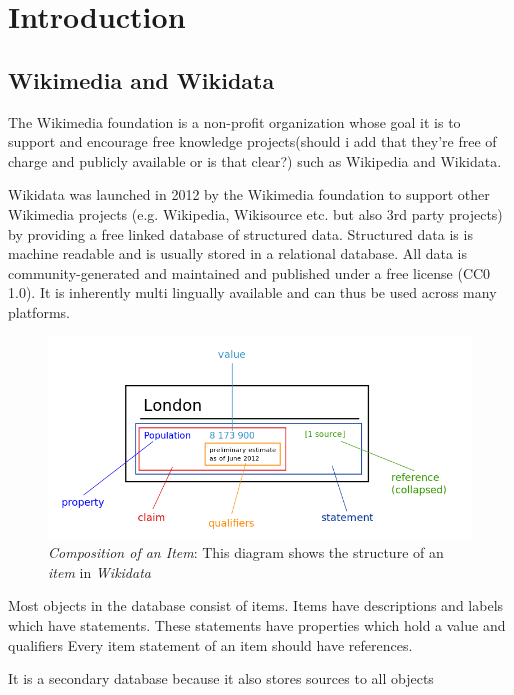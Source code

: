\chapter{Introduction}
\section{Wikimedia and Wikidata}\label{introduction}

The Wikimedia foundation is a non-profit organization whose goal it is to support and encourage free knowledge projects(should i add that they're free of charge and publicly available or is that clear?) such as Wikipedia and Wikidata.

Wikidata was launched in 2012 by the Wikimedia foundation to support other Wikimedia projects (e.g. Wikipedia, Wikisource etc. but also 3rd party projects) by providing a free linked database of structured data. Structured data is is machine readable and is usually stored in a relational database. All data is community-generated and maintained and published under a free license (CC0 1.0). It is inherently multi lingually available and can thus be used across many platforms.


\begin{figure}[h]
	\centering
	\includegraphics[width=1\textwidth]{Figures/statement.png}
	\caption{\textit{Composition of an Item}: This diagram shows the structure of an \textit{item} in \textit{Wikidata}}
\end{figure}

Most objects in the database consist of items. Items have descriptions and labels which have statements. These statements have properties which hold a value and qualifiers Every item statement of an item should have references.


It is a secondary  database because it also stores sources to all objects


